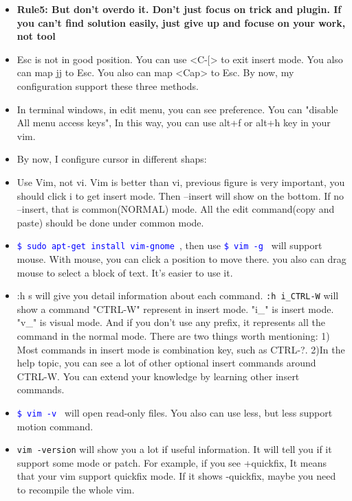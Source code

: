 \documentclass[a4paper,12pt,twoside]{book}
\newcommand{\linuxcommand}[1]{\texttt{\textcolor{blue}{\$ #1 \Pisymbol{psy}{191}}}}
\begin{document}
\begin{itemize}
\begin{itemize}
		\item \textbf{Rule5: But don't overdo it. Don't just focus on trick and plugin. If you can't find solution easily, just give up and focuse on your work, not tool}

		\item Esc is not in good position. You can use <C-$[$> to exit insert mode. You also can map jj to Esc. You also can map <Cap> to Esc. By now, my configuration support these three methods. 

		\item In terminal windows, in edit menu, you can see preference. You can "disable All menu access keys", In this way, you can use alt+f or alt+h key in your vim. 

		\item By now, I configure cursor in different shaps: 

		\item Use Vim, not vi. Vim is better than vi, previous figure is very important, you should click i to get insert mode. Then --insert will show on the bottom. If no --insert, that is common(NORMAL) mode. All the edit command(copy and paste) should be done under common mode. 

\item \linuxcommand{sudo apt-get install vim-gnome}, then use \linuxcommand{vim -g} will support mouse.  With mouse, you can click a position to move there. you also can drag mouse to select a block of text. It's easier to use it. 

\item :h s will give you detail information about each command. \verb=:h i_CTRL-W= will show a command "CTRL-W" represent in insert mode. "i\_" is insert mode. "v\_" is visual mode. And if you don't use any prefix, it represents all the command in the normal mode. There are two things worth mentioning: 1) Most commands in insert mode is combination key, such as CTRL-?. 2)In the help topic, you can see a lot of other optional insert commands around CTRL-W. You can extend your knowledge by learning other insert commands.

\item \linuxcommand{vim -v} will open read-only files. You also can use less, but less support motion command.

\item \verb=vim -version= will show you a lot if useful information. It will tell you if it support some mode or patch. For example, if you see +quickfix, It means that your vim support quickfix mode. If it shows -quickfix, maybe you need to recompile the whole vim.


\end{itemize}
\end{itemize}
\end{document}

